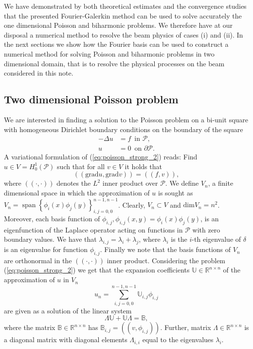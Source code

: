 \documentclass[a4paper,10pt]{article}
\newcommand{\R}{\ensuremath{\mathbb{R}}}
\newcommand{\Inner}[2]{\ensuremath{\left(\left(#1, #2\right)\right)}}
\newcommand{\Grad}[1]{\ensuremath{\text{grad}#1}}
\DeclareMathOperator{\spn}{span}
\begin{document}
  We have demonstrated by both theoretical estimates and the convergence studies
  that the presented Fourier-Galerkin method can be used to solve accurately 
  the one dimensional Poisson and biharmonic problems. We therefore have at our
  disposal a numerical method to resolve the beam physics of cases (i) and (ii).
  In the next sections we show how the Fourier basis can be used to construct
  a numerical method for solving Poisson and biharmonic problems in two dimensional
  domain, that is to resolve the physical processes on the beam considered
  in this note.

  \subsection{Two dimensional Poisson problem}
  We are interested in finding a solution to the Poisson problem on a bi-unit
  square with homogeneous Dirichlet boundary conditions on the boundary of the
  square
  \begin{equation}
  \label{eq:poisson_strong_2}
  \begin{aligned}
    -\Delta u &= f\,\text{ in }\mathcal{P},\\
            u &= 0\,\text{ on }\partial\mathcal{P}.
  \end{aligned}
  \end{equation}
  A variational formulation of (\ref{eq:poisson_strong_2}) reads: Find $u\in
  V= H^1_0\left(\mathcal{P}\right)$ such that for all $v\in V$ it holds
  that
  \begin{equation}
    \label{eq:poisson_weak_2}
    \Inner{\Grad{u}}{\Grad{v}} = \Inner{f}{v},
  \end{equation}
  where $\Inner{\cdot}{\cdot}$ denotes the $L^2$ inner product over $\mathcal{P}$.
  We define $V_n$, a finite dimensional space in which the approximation of $u$
  is sought as $V_n=\spn\left\{\phi_i(x)\phi_j(y)\right\}_{i, j = 0, 0}^{n-1, n-1}$.
  Clearly, $V_n\subset V$ and $\text{dim}V_n = n^2$. Moreover, each basis function of
  $\phi_{i, j}, \phi_{i, j}(x, y)=\phi_i(x)\phi_j(y)$, is an eigenfunction
  of the Laplace operator acting on functions in $\mathcal{P}$ with zero boundary
  values. We have that $\lambda_{i, j}=\lambda_i + \lambda_j$, where $\lambda_i$
  is the $i$-th eigenvalue of $\delta$ is an eigenvalue for function $\phi_{i, j}$.
  Finally we note that the basis functions of $V_n$ are orthonormal in the
  $\Inner{\cdot}{\cdot}$ inner product. Considering the problem (\ref{eq:poisson_strong_2})
  we get that the expansion coefficients $\mathbb{U}\in\R^{n\times n}$ of the
  approximation of $u$ in $V_n$
  \[
    u_n=\sum\limits_{i, j = 0, 0}^{n-1, n-1}\mathbb{U}_{i,
    j}\phi_{i, j}
  \]
  are given as a solution of the linear system
  \begin{equation}
    \label{eq:p_sys}
    \Lambda\mathbb{U} + \mathbb{U}\Lambda = \mathbb{B},
  \end{equation}
  where the matrix $\mathbb{B}\in\R^{n\times n}$ has $\mathbb{B}_{i,
  j}=\Inner{v}{\phi_{i, j}}$. Further, matrix $\Lambda\in\R^{n\times n}$ is
  a diagonal matrix with diagonal elements $\Lambda_{i, i}$ equal to the
  eigenvalues $\lambda_i$.
  
\end{document}
